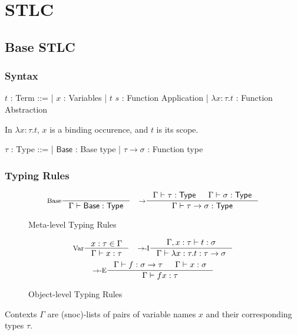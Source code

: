 \documentclass[a4paper]{report}
\newcommand{\Base}[0]{\mathsf{Base}}
\newcommand{\Type}[0]{\mathsf{Type}}
\newcommand{\Intro}[1]{#1-\textrm{I}}
\newcommand{\Elim}[1]{#1-\textrm{E}}
\begin{document}
\tableofcontents
\chapter{STLC}

\section{Base STLC}
\subsection{Syntax}
\begin{bnf}
$t$ : \textsf{Term} ::=
| $x$ : Variables
| $t$ $s$ : Function Application
| $\lambda x \colon \tau. t$ : Function Abstraction
\end{bnf}

\hfill\break
In $\lambda x \colon \tau. t$, $x$ is a binding occurence, and $t$ is its scope.

\noindent
\begin{bnf}
$\tau$ : \textsf{Type} ::=
| $\Base$ : Base type
| $\tau \to \sigma$ : Function type
\end{bnf}

\subsection{Typing Rules}
\begin{figure*}[h]
  \[
    \inference[Base]{}
                    {\Gamma \vdash \Base : \Type}
    \quad
    \inference[$\to$]{\Gamma \vdash \tau : \Type & \Gamma \vdash \sigma : \Type}
                     {\Gamma \vdash \tau \to \sigma : \Type}
  \]
  
  \caption*{Meta-level Typing Rules}
  \label{fig:base-stlc-mltr}
\end{figure*}

\begin{figure*}[h]
  \[
    \inference[Var]{x : \tau \in \Gamma}
                   {\Gamma \vdash x : \tau}
    \quad
    \inference[\Intro{$\to$}]{\Gamma, x : \tau \vdash t : \sigma}
                             {\Gamma \vdash \lambda x : \tau. t : \tau \to \sigma}
  \]
  \[
    \inference[\Elim{$\to$}]{\Gamma \vdash f : \sigma \to \tau & \Gamma \vdash x : \sigma}
                            {\Gamma \vdash f x : \tau}
  \]
  
  \caption*{Object-level Typing Rules}
  \label{fig:base-stlc-oltr}
\end{figure*}

Contexts $\Gamma$ are (snoc)-lists of pairs of variable names $x$ and their corresponding types $\tau$.
\end{document}

